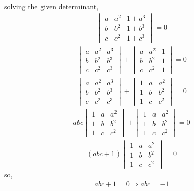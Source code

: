 \documentclass{beamer}
\providecommand{\brak}[1]{\ensuremath{\left(#1\right)}}
\theoremstyle{remark}
\newcommand{\mydet}[1]{\ensuremath{\begin{vmatrix}#1\end{vmatrix}}}
\numberwithin{equation}{section}
\begin{document}
solving the given determinant,
\begin{align}
\mydet{a &a^2 &1+ a^3\\ b & b^2 & 1 + b^3\\c & c^2 & 1 + c^3} = 0
\end{align}
\begin{align}
\mydet{a &a^2 & a^3\\ b & b^2 & b^3\\c & c^2 & c^3} + \mydet{a &a^2 & 1\\ b & b^2 & 1\\c & c^2 & 1} = 0
\end{align}
\begin{align}
		\mydet{a &a^2 & a^3\\ b & b^2 & b^3\\c & c^2 & c^3} + \mydet{1&a &a^2 \\1& b & b^2 \\1& c & c^2} = 0
\end{align}
\begin{align}
		 abc\mydet{1&a &a^2 \\1& b & b^2 \\1& c & c^2}  + \mydet{1&a &a^2 \\1& b & b^2 \\1& c & c^2} = 0
\end{align}
\begin{align}
		\brak{abc+1}\mydet{1&a &a^2 \\1& b & b^2 \\1& c & c^2}	= 0
\end{align}
so,
\begin{align}
abc+1 = 0\Rightarrow
abc = -1
\end{align}
\end{document}
